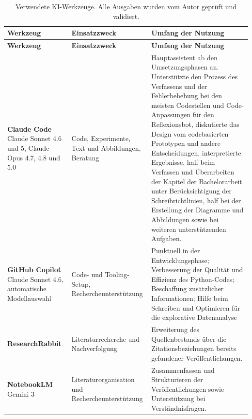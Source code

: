 \begingroup
\small
\setlength{\tabcolsep}{6pt}
\renewcommand{\arraystretch}{1.15}
\begin{longtable}{%
        >{\raggedright\arraybackslash}p{3.2cm}%
        >{\raggedright\arraybackslash}p{3.9cm}%
        >{\raggedright\arraybackslash}p{7.0cm}}
    \caption{Verwendete KI-Werkzeuge. Alle Ausgaben wurden vom Autor geprüft und validiert.}
    \label{tab:ki-werkzeuge} \\
    \toprule
    \textbf{Werkzeug} & \textbf{Einsatzzweck} & \textbf{Umfang der Nutzung} \\
    \midrule
    \endfirsthead
    \toprule
    \textbf{Werkzeug} & \textbf{Einsatzzweck} & \textbf{Umfang der Nutzung} \\
    \midrule
    \endhead
    \bottomrule
    \endfoot

    \textbf{Claude Code}\newline
    {\footnotesize Claude Sonnet 4.6 und 5, Claude Opus 4.7, 4.8 und 5.0} &
    Code, Experimente, Text und Abbildungen, Beratung &
    Hauptassistent ab den Umsetzungsphasen an. Unterstützte den Prozess des Verfassens und 
    der Fehlerbehebung bei den meisten Codestellen und Code-Anpassungen für den Reflexionsbot, diskutierte das Design vom codebasierten Prototypen
    und andere Entscheidungen, interpretierte Ergebnisse, half 
    beim Verfassen und Überarbeiten der Kapitel der Bachelorarbeit 
    unter Berücksichtigung der Schreibrichtlinien, half bei der Erstellung der Diagramme 
    und Abbildungen sowie bei weiteren unterstützenden Aufgaben. \\
    \midrule

    \textbf{GitHub Copilot}\newline
    {\footnotesize Claude Sonnet 4.6, automatische Modellauswahl} &
    Code- und Tooling-Setup, Recherche\-unterstützung &
    Punktuell in der Entwicklungsphase; Verbesserung der Qualität und Effizienz des Python-Codes; Beschaffung zusätzlicher Informationen; Hilfe beim Schreiben und Optimieren für die explorative Datenanalyse\\
    \midrule

    \textbf{ResearchRabbit} &
    Literaturrecherche und Nachverfolgung &
    Erweiterung des Quellenbestands über die Zitationsbeziehungen
    bereits gefundener Veröffentlichungen. \\
    \midrule

    \textbf{NotebookLM}\newline
    {\footnotesize Gemini 3} &
    Literatur\-organisation und Recherche\-unterstützung &
    Zusammenfassen und Strukturieren der Veröffentlichungen sowie
    Unterstützung bei Verständnisfragen. \\
\end{longtable}
\endgroup

